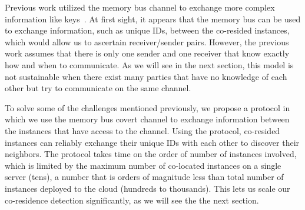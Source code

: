 Previous work utilized the memory bus channel to exchange more complex
information like keys~\cite{wuusenix2012}. At first sight, it appears that the
memory bus can be used to exchange information, such as unique IDs, between the
co-resided instances, which would allow us to ascertain receiver/sender pairs.
However, the previous work assumes that there is only one sender and one
receiver that know exactly how and when to communicate. As we will see in the
next section, this model is not sustainable when there exist many parties that
have no knowledge of each other but try to communicate on the same channel.

To solve some of the challenges mentioned previously, we propose a protocol in
which we use the memory bus covert channel to exchange information between the
instances that have access to the channel. Using the protocol, co-resided
instances can reliably exchange their unique IDs with each other to discover
their neighbors. The protocol takes time on the order of number of instances
involved, which is limited by the maximum number of co-located instances on a
single server (tens), a number that is orders of magnitude less than total
number of instances deployed to the cloud (hundreds to thousands).  This lets us
scale our co-residence detection significantly, as we will see the the next
section.
